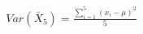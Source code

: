 \documentclass[preview]{standalone}
\begin{document}
\begin{align*}
Var(\bar{X}_5) = \frac{\sum_{i=1}^{5}(x_i - \mu)^2}{5}
\end{align*}
\end{document}

